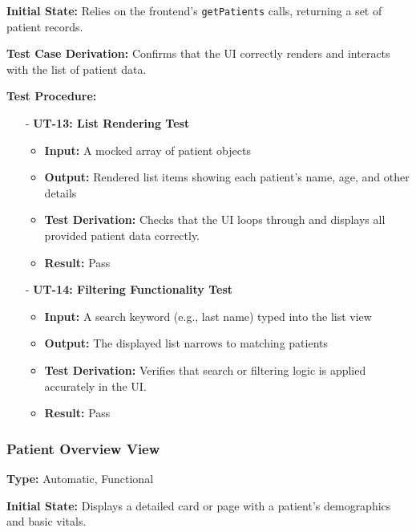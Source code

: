 \documentclass[12pt, titlepage]{article}
\begin{document}
\noindent \textbf{Initial State:}
Relies on the frontend's \texttt{getPatients} calls, returning a set of patient records.
\vspace{10pt}

\noindent \textbf{Test Case Derivation:}
Confirms that the UI correctly renders and interacts with the list of patient data.
\vspace{10pt}

\noindent \textbf{Test Procedure:}
\begin{itemize}
   \item[-] \textbf{UT-13: List Rendering Test} \label{test:patients-list-render}
   \begin{itemize}
     \item \textbf{Input:} A mocked array of patient objects
     \item \textbf{Output:} Rendered list items showing each patient's name, age, and other details
     \item \textbf{Test Derivation:} Checks that the UI loops through and displays all provided patient data correctly.
     \item \textbf{Result:} Pass
   \end{itemize}

   \item[-] \textbf{UT-14: Filtering Functionality Test} \label{test:patients-list-filter}
   \begin{itemize}
     \item \textbf{Input:} A search keyword (e.g., last name) typed into the list view
     \item \textbf{Output:} The displayed list narrows to matching patients
     \item \textbf{Test Derivation:} Verifies that search or filtering logic is applied accurately in the UI.
     \item \textbf{Result:} Pass
   \end{itemize}
\end{itemize}


\subsubsection{Patient Overview View}
\textbf{Type:} Automatic, Functional
\vspace{10pt}

\noindent \textbf{Initial State:}
Displays a detailed card or page with a patient's demographics and basic vitals.
\vspace{10pt}
\end{document}
